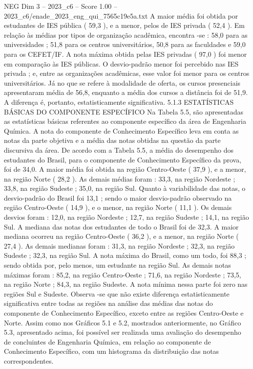 \begin{textsample}{NEG Dim 3 – 2023\_c6 – Score 1.00 – 2023\_c6/enade\_2023\_eng\_qui\_7565c19e5a.txt}
A maior média foi obtida por estudantes de IES pública ( 59,3 ), e a menor, pelos de IES privada ( 52,4 ).
Em relação às médias por tipos de organização acadêmica, encontra -se : 58,0 para as universidades ; 51,8 para os centros universitários, 50,8 para as faculdades e 59,0 para os CEFET/IF.
A nota máxima obtida pelas IES privadas ( 97,0 ) foi menor em comparação às IES públicas.
O desvio-padrão menor foi percebido nas IES privada ; e, entre as organizações acadêmicas, esse valor foi menor para os centros universitários.
Já no que se refere à modalidade de oferta, os cursos presenciais apresentaram média de 56,8, enquanto a média dos cursos a distância foi de 51,9.
A diferença é, portanto, estatisticamente significativa. 5.1.3 ESTATÍSTICAS BÁSICAS DO COMPONENTE ESPECÍFICO Na Tabela 5.5, são apresentadas as estatísticas básicas referentes ao componente específico da área de Engenharia Química.
A nota do componente de Conhecimento Específico leva em conta as notas da parte objetiva e a média das notas obtidas na questão da parte discursiva da área.
De acordo com a Tabela 5.5, a média do desempenho dos estudantes do Brasil, para o componente de Conhecimento Específico da prova, foi de 34,0.
A maior média foi obtida na região Centro-Oeste ( 37,9 ), e a menor, na região Norte ( 28,2 ).
As demais médias foram : 33,3, na região Nordeste ; 33,8, na região Sudeste ; 35,0, na região Sul.
Quanto à variabilidade das notas, o desvio-padrão do Brasil foi 13,1 ; sendo o maior desvio-padrão observado na região Centro-Oeste ( 14,9 ), e o menor, na região Norte ( 11,1 ).
Os demais desvios foram : 12,0, na região Nordeste ; 12,7, na região Sudeste ; 14,1, na região Sul.
A mediana das notas dos estudantes de todo o Brasil foi de 32,3.
A maior mediana ocorreu na região Centro-Oeste ( 36,2 ), e a menor, na região Norte ( 27,4 ).
As demais medianas foram : 31,3, na região Nordeste ; 32,3, na região Sudeste ; 32,3, na região Sul.
A nota máxima do Brasil, como um todo, foi 88,3 ; sendo obtida por, pelo menos, um estudante na região Sul.
As demais notas máximas foram : 85,2, na região Centro-Oeste ; 71,6, na região Nordeste ; 73,5, na região Norte ; 84,3, na região Sudeste.
A nota mínima nessa parte foi zero nas regiões Sul e Sudeste.
Observa -se que não existe diferença estatisticamente significativa entre todas as regiões na análise das médias das notas do componente de Conhecimento Específico, exceto entre as regiões Centro-Oeste e Norte.
Assim como nos Gráficos 5.1 e 5.2, mostrados anteriormente, no Gráfico 5.3, apresentado acima, foi possível ser realizada uma avaliação do desempenho de concluintes de Engenharia Química, em relação ao componente de Conhecimento Específico, com um histograma da distribuição das notas correspondentes.

\end{textsample}
